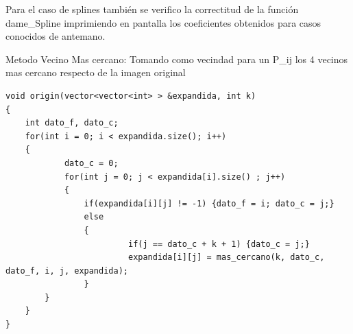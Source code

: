 \documentclass[a4paper]{article}
\begin{document}
Para el caso de splines también se verifico la correctitud de la función dame_Spline imprimiendo en pantalla los coeficientes obtenidos para casos conocidos de antemano.

Metodo Vecino Mas cercano: Tomando como vecindad para un P_ij los 4 vecinos mas cercano respecto de la imagen original 


\begin{verbatim}
void origin(vector<vector<int> > &expandida, int k)
{
    int dato_f, dato_c;
    for(int i = 0; i < expandida.size(); i++)
    {
    	    dato_c = 0;
    	    for(int j = 0; j < expandida[i].size() ; j++)
    	    {
    		    if(expandida[i][j] != -1) {dato_f = i; dato_c = j;}
    		    else
    		    {
    			         if(j == dato_c + k + 1) {dato_c = j;}
    			         expandida[i][j] = mas_cercano(k, dato_c, dato_f, i, j, expandida); 
    	        }
        }
    }
}
\end{verbatim} 
\end{document}

